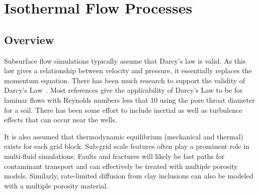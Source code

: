 %
%

\def\bnabla{{\boldsymbol{\nabla}}}
\def\bg{{\boldsymbol{g}}}
\def\bq{{\boldsymbol{q}}}
\def\bx{{\boldsymbol{x}}}
\def\bJ{{\boldsymbol{J}}}
\def\K{{\mathbb K}}

\def\Frac{\displaystyle \frac}

\def\ucdot{{\,\cdot\,}}
\def\ukg{{\rm kg}}
\def\um{{\rm m}}
\def\us{{\rm s}}
\def\umol{{\rm mol}}
\def\upa{{\rm Pa}}

\section{Isothermal Flow Processes}         
\label{sec:flow-processes}

\subsection{Overview}

Subsurface flow simulations typically assume that Darcy's law is valid. 
As this law gives a relationship between velocity and pressure,
it essentially replaces the momentum equation. 
There has been much research to support the validity of Darcy's
Law~\citep{bear-1972}.
Most references give the applicability of Darcy's Law to be 
for laminar flows with Reynolds numbers less that 10 using the pore throat diameter for a soil.
There has been some effort to include inertial as well as turbulence effects that can occur near the wells.

It is also assumed that thermodynamic equilibrium (mechanical and thermal) exists for each grid block.  
Sub-grid scale features often play a prominent role in multi-fluid simulations. 
Faults and fractures will likely be fast paths for contaminant transport and can
effectively be treated with multiple porosity models. 
Similarly, rate-limited diffusion from clay inclusions can also be modeled with a
multiple porosity material.



